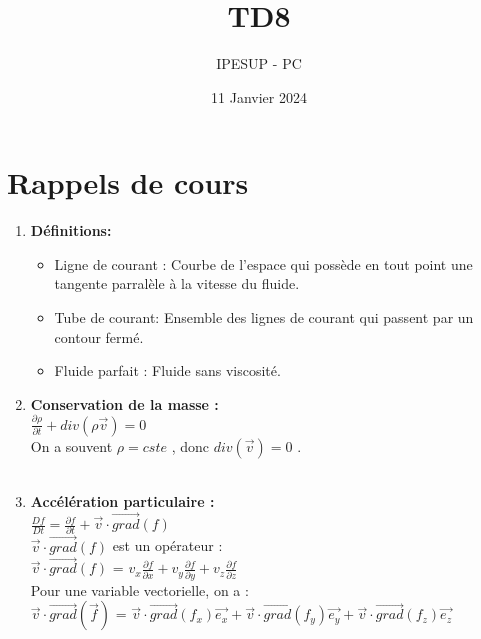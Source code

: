 \documentclass{article}
\title{TD8}
\author{IPESUP - PC }
\date{11 Janvier 2024}
\begin{document}
\maketitle



\section{Rappels de cours}
\begin{enumerate}

    \item \textbf{Définitions:}\\[0.1cm]
    \begin {itemize}
    \item Ligne de courant : Courbe de l'espace qui possède en tout point une tangente parralèle à la vitesse du fluide.\\
    \item Tube de courant: Ensemble des lignes de courant qui passent par un contour fermé.\\
    \item Fluide parfait : Fluide sans viscosité.\\
    \end{itemize}
    \item  \textbf{Conservation de la masse : }\\[0.1cm]
$     \frac{\partial \rho}{\partial t} + div(\rho \vec{v}) = 0$ \\

On a souvent $\rho = cste$ , donc $ div(\vec{v}) = 0 $ . \\[0.1cm]

\\
\item \textbf{Accélération particulaire :}
 \\[0.1cm]

$\frac{Df}{Dt} = \frac{\partial f}{\partial t} + \vec{v} \cdot \vec{grad}(f)$\\

$\vec{v} \cdot \vec{grad}(f)$ est un opérateur : \\

$\vec{v} \cdot \vec{grad}(f)$ = $v_x \frac{\partial f}{\partial x} + v_y \frac{\partial f}{\partial y} + v_z \frac{\partial f}{\partial z}$\\

Pour une variable vectorielle, on a : \\[0.2cm]
$\vec{v} \cdot \vec{grad}(\vec{f})$ = $\vec{v} \cdot \vec{grad} (f_x) \vec{e_x} + \vec{v} \cdot \vec{grad} (f_y) \vec{e_y} + \vec{v} \cdot \vec{grad} (f_z) \vec{e_z} $\\


\end{enumerate}
\end{document}
